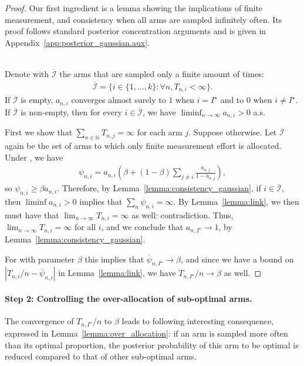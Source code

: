 \begin{proof} Our first ingredient is a lemma showing the implications of finite measurement, and consistency when all arms are sampled infinitely often. Its proof follows standard posterior concentration arguments and is given in Appendix~\ref{app:posterior_gaussian.aux}.

\begin{lemma}\label{lemma:consistency_gaussian}\ \\
	Denote with $\overline{\mathcal{I}}$ the arms that are sampled only a finite amount of times:
	\begin{align*}
	\overline{\mathcal{I}} = \{ i \in \{ 1, \ldots, k \} : \forall n, T_{n,i} < \infty \}.
	\end{align*}
	If $\overline{\mathcal{I}}$ is empty, $a_{n,i}$ converges almost surely to $1$ when $i = I^\star$ and to $0$ when $i \neq I^\star$. If $\overline{\mathcal{I}}$ is non-empty, then for every $i \in \overline{\mathcal{I}}$, we have $\liminf_{n \rightarrow \infty} a_{n,i} > 0$ a.s.
\end{lemma}

	First we show that $\sum_{n \in \mathbb{N}} T_{n,j} = \infty$ for each arm $j$. Suppose otherwise. Let $\overline{\mathcal{I}}$ again be the set of arms to which only finite measurement effort is allocated. Under \TTTS, we have
	\begin{align*}
	\psi_{n,i} = a_{n,i} \left( \beta + (1-\beta) \sum_{j \neq i} \frac{a_{n,j}}{1- a_{n,j}} \right),
	\end{align*}
	so $ \psi_{n,i}  \geq \beta a_{n,i}$. Therefore, by Lemma~\ref{lemma:consistency_gaussian}, if $i \in \overline{\mathcal{I}}$, then $\liminf a_{n,i} > 0$ implies that $\sum_n \psi_{n,i} = \infty$. By Lemma~\ref{lemma:link}, we then must have that $\lim_{n \rightarrow \infty} T_{n,i} = \infty$ as well: contradiction.  Thus, $\lim_{n \rightarrow \infty} T_{n,i} = \infty$ for all $i$, and we conclude that $a_{n,I^\star} \rightarrow 1$, by Lemma~\ref{lemma:consistency_gaussian}. 
	
	For \TTTS with parameter $\beta$ this implies that $\overline{\psi}_{n, I^\star} \rightarrow \beta$, and since we have a bound on $| T_{n,i} / n - \overline{\psi}_{n, i} |$ in Lemma~\ref{lemma:link}, we have $T_{n, I^\star} / n \rightarrow \beta$ as well.
\end{proof}

\paragraph{Step 2:  Controlling the over-allocation of sub-optimal arms.}
The convergence of $T_{n,I^\star}/n$ to $\beta$ leads to following interesting consequence, expressed in Lemma~\ref{lemma:over_allocation}: if an arm is sampled more often than its optimal proportion, the posterior probability of this arm to be optimal is reduced compared to that of other sub-optimal arms.

